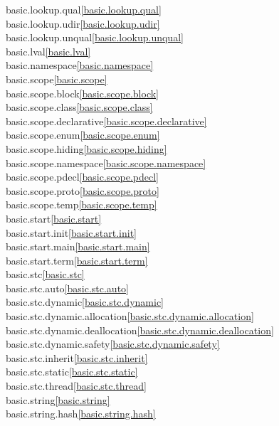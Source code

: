 \begin{multicols}{2}
basic.lookup.qual\quad\ref{basic.lookup.qual}\\
basic.lookup.udir\quad\ref{basic.lookup.udir}\\
basic.lookup.unqual\quad\ref{basic.lookup.unqual}\\
basic.lval\quad\ref{basic.lval}\\
basic.namespace\quad\ref{basic.namespace}\\
basic.scope\quad\ref{basic.scope}\\
basic.scope.block\quad\ref{basic.scope.block}\\
basic.scope.class\quad\ref{basic.scope.class}\\
basic.scope.declarative\quad\ref{basic.scope.declarative}\\
basic.scope.enum\quad\ref{basic.scope.enum}\\
basic.scope.hiding\quad\ref{basic.scope.hiding}\\
basic.scope.namespace\quad\ref{basic.scope.namespace}\\
basic.scope.pdecl\quad\ref{basic.scope.pdecl}\\
basic.scope.proto\quad\ref{basic.scope.proto}\\
basic.scope.temp\quad\ref{basic.scope.temp}\\
basic.start\quad\ref{basic.start}\\
basic.start.init\quad\ref{basic.start.init}\\
basic.start.main\quad\ref{basic.start.main}\\
basic.start.term\quad\ref{basic.start.term}\\
basic.stc\quad\ref{basic.stc}\\
basic.stc.auto\quad\ref{basic.stc.auto}\\
basic.stc.dynamic\quad\ref{basic.stc.dynamic}\\
basic.stc.dynamic.allocation\quad\ref{basic.stc.dynamic.allocation}\\
basic.stc.dynamic.deallocation\quad\ref{basic.stc.dynamic.deallocation}\\
basic.stc.dynamic.safety\quad\ref{basic.stc.dynamic.safety}\\
basic.stc.inherit\quad\ref{basic.stc.inherit}\\
basic.stc.static\quad\ref{basic.stc.static}\\
basic.stc.thread\quad\ref{basic.stc.thread}\\
basic.string\quad\ref{basic.string}\\
basic.string.hash\quad\ref{basic.string.hash}\\

\end{multicols}
